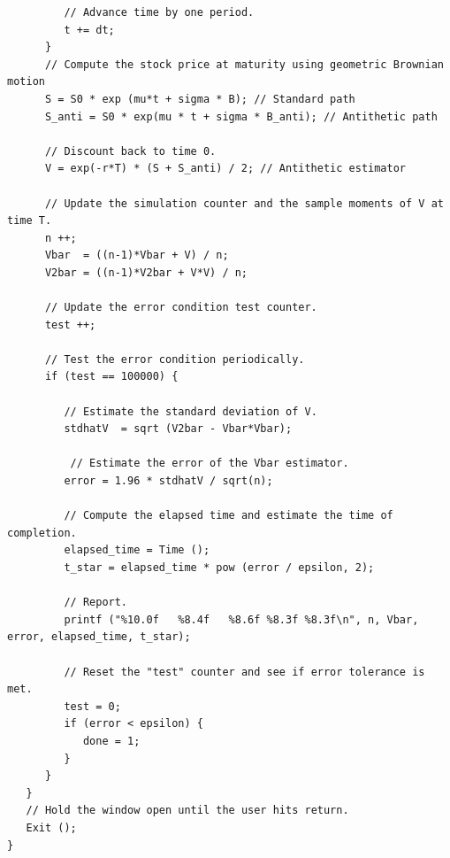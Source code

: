 \documentclass{report}
\begin{document}
\begin{lstlisting}
         // Advance time by one period.
         t += dt;
      }
      // Compute the stock price at maturity using geometric Brownian motion
      S = S0 * exp (mu*t + sigma * B); // Standard path
      S_anti = S0 * exp(mu * t + sigma * B_anti); // Antithetic path

      // Discount back to time 0.
      V = exp(-r*T) * (S + S_anti) / 2; // Antithetic estimator

      // Update the simulation counter and the sample moments of V at time T.
      n ++;
      Vbar  = ((n-1)*Vbar + V) / n;
      V2bar = ((n-1)*V2bar + V*V) / n;

      // Update the error condition test counter.
      test ++;

      // Test the error condition periodically.
      if (test == 100000) {

         // Estimate the standard deviation of V.
         stdhatV  = sqrt (V2bar - Vbar*Vbar);

          // Estimate the error of the Vbar estimator.
         error = 1.96 * stdhatV / sqrt(n);

         // Compute the elapsed time and estimate the time of completion.
         elapsed_time = Time ();
         t_star = elapsed_time * pow (error / epsilon, 2);

         // Report.
         printf ("%10.0f   %8.4f   %8.6f %8.3f %8.3f\n", n, Vbar, error, elapsed_time, t_star);

         // Reset the "test" counter and see if error tolerance is met.
         test = 0;
         if (error < epsilon) {
            done = 1;
         }
      }
   }
   // Hold the window open until the user hits return.
   Exit ();
}
\end{lstlisting}
\pagebreak
\end{document}
